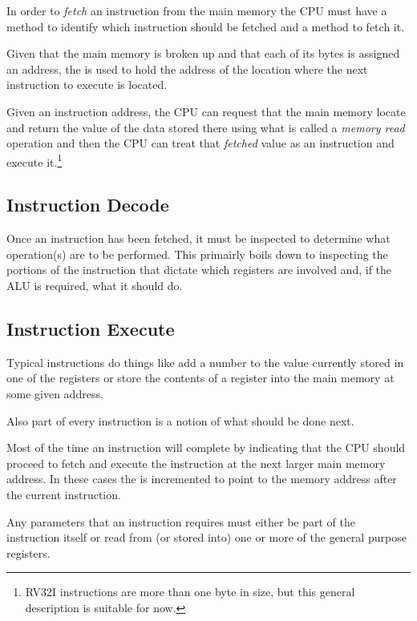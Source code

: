 In order to {\em fetch} an instruction from the main memory the CPU
must have a method to identify which instruction should be fetched and
a method to fetch it. 

Given that the main memory is broken up and that each of its bytes is 
assigned an address, the  is used to hold the address of the
location where the next instruction to execute is located.

Given an instruction address, the CPU can request that the main memory 
locate and return the value of the data stored there using what is called 
a {\em memory read} operation and then the CPU can treat that {\em fetched}
value as an instruction and execute it.\footnote{RV32I instructions are 
more than one byte in size, but this general description is suitable for now.}


\subsection{Instruction Decode}

Once an instruction has been fetched, it must be inspected to determine what
operation(s) are to be performed.  This primairly boils down to inspecting
the portions of the instruction that dictate which registers are involved
and, if the ALU is required, what it should do.


\subsection{Instruction Execute}

Typical instructions do things like add a number to the value
currently stored in one of the registers or store the contents of a
register into the main memory at some given address.

Also part of every instruction is a notion of what should be done next.

Most of the time an instruction will complete by indicating that
the CPU should proceed to fetch and execute the instruction at the next
larger main memory address.  In these cases the  is incremented
to point to the memory address after the current instruction.

Any parameters that an instruction requires must either be part of 
the instruction itself or read from (or stored into) one or more of the 
general purpose registers.

